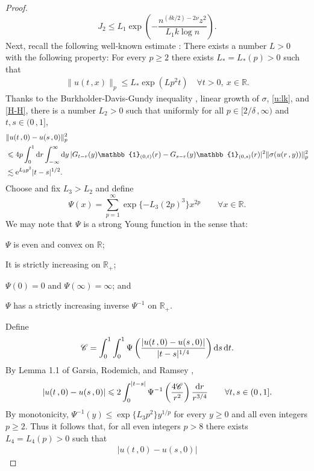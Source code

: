\documentclass[reqno]{amsart}
\newcommand{\<}{\langle}
\renewcommand{\>}{\rangle}
\newcommand{\R}{\mathbb{R}}
\newcommand{\1}{\mathbb{1}}
\renewcommand{\d}{{\rm d}}
\newcommand{\e}{{\rm e}}
\renewcommand{\ge}{\geqslant}
\renewcommand{\le}{\leqslant}
\theoremstyle{definition}
\numberwithin{equation}{section}
\begin{document}
\begin{proof}
\begin{equation}
		J_2 \le L_1 \exp\left( - \frac{n^{(\delta k/2) -2\nu} z^2}{L_1 k \log n} \right).
	\end{equation}
	Next, recall the following well-known estimate \cite[Theorem 5.5]{CBMS}: 
	There exists a number $L>0$ with the following property:
	For every $p\ge2$ there exists $L_*=L_*(p)>0$
	such that
	\begin{align}\label{u:lk}
		\|u(t\,,x)\|_p \le L_* \exp(L p^2 t) \quad
		\forall t>0,\ x\in\R.
	\end{align}
	Thanks to the Burkholder-Davis-Gundy inequality
	\cite[Proposition 5.2]{CBMS}, linear growth of $\sigma$, \eqref{u:lk}, 
	and \eqref{H-H}, there is a number $L_2>0$ such that uniformly
	for all $p \in [2/\delta\,,\infty)$ and $t,s\in (0\,,1]$,
	\begin{align}
		&\|u(t\,,0)-u(s\,,0)\|_p^2\notag\\
		 &\le 4 p \int_0^1 \d r \int_{-\infty}^\infty \d y \, 
		 	|G_{t-r}(y)\1_{(0,t)}(r)-G_{s-r}(y)\1_{(0,s)}(r)|^2 \|\sigma(u(r\,,y))\|_p^2\notag\\
		 &\lesssim \e^{L_2 p^2} |t-s|^{1/2}.\label{u-u:lk}
	\end{align}
	Choose and fix $L_3>L_2$ and define
	\[
		\Psi(x) = \sum_{p=1}^\infty \exp\{-L_3 (2p)^3\} x^{2p}
		\qquad\forall x\in\R.
	\]
	We may note that $\Psi$ is a strong Young function in the sense that:
	\begin{compactenum}
		\item $\Psi$ is even and convex on $\R$;
		\item It is strictly increasing on $\R_+$;
		\item $\Psi(0)=0$ and $\Psi(\infty)=\infty$; and
		\item $\Psi$ has a strictly increasing inverse $\Psi^{-1}$ on $\R_+$.
	\end{compactenum}
	Define
	\[
		\mathscr{C} = \int_0^1 \int_0^1 \Psi\left( \frac{|u(t\,,0)-u(s\,,0)|}{|t-s|^{1/4}} \right) \d s \, \d t.
	\]
	By Lemma 1.1 of Garsia, Rodemich, and Ramsey \cite{GarsiaRR},
	\begin{align*}
		|u(t\,,0)-u(s\,,0)| \le 2 \int_0^{|t-s|}
		\Psi^{-1}\left(\frac{4\mathscr{C}}{r^2}\right)
		\frac{\d r}{r^{3/4}} \qquad \forall t, s \in (0\,,1].
	\end{align*}
	By monotonicity, $\Psi^{-1}(y) \le \exp\{L_3 p^2\} y^{1/p}$ for every $y\ge0$ 
	and all even integers $p \ge 2$.
	Thus it follows that,
	for all even integers $p > 8$ there exists $L_4=L_4(p)>0$ such that
	\begin{align*}
		|u(t\,,0)-u(s\,,0)|

\end{align*}
\end{proof}
\end{document}
